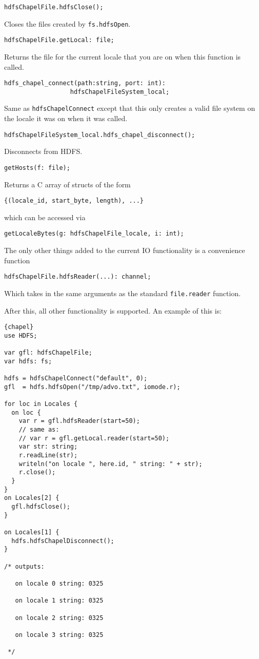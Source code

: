 \begin{lstlisting}
hdfsChapelFile.hdfsClose();
\end{lstlisting}
Closes the files created by {\tt fs.hdfsOpen}.

\begin{lstlisting}
hdfsChapelFile.getLocal: file;
\end{lstlisting}
Returns the file for the current locale that you are on when this function is called.

\begin{lstlisting}
hdfs_chapel_connect(path:string, port: int): 
                  hdfsChapelFileSystem_local;
\end{lstlisting}
Same as {\tt hdfsChapelConnect} except that this only creates a valid file system on the
locale it was on when it was called.

\begin{lstlisting}
hdfsChapelFileSystem_local.hdfs_chapel_disconnect();
\end{lstlisting}
Disconnects from HDFS.

\begin{lstlisting}
getHosts(f: file);
\end{lstlisting}
Returns a C array of structs of the form 
\begin{lstlisting}
{(locale_id, start_byte, length), ...}
\end{lstlisting}
which can be accessed via 
\begin{lstlisting}
getLocaleBytes(g: hdfsChapelFile_locale, i: int);
\end{lstlisting}
The only other things added to the current IO functionality is a convenience function
\begin{lstlisting}
hdfsChapelFile.hdfsReader(...): channel;
\end{lstlisting}
Which takes in the same arguments as the standard {\tt file.reader} function.

After this, all other functionality is supported. An example of this is:
\begin{lstlisting}{chapel}
use HDFS;

var gfl: hdfsChapelFile;
var hdfs: fs;

hdfs = hdfsChapelConnect("default", 0);
gfl  = hdfs.hdfsOpen("/tmp/advo.txt", iomode.r);

for loc in Locales {
  on loc {
    var r = gfl.hdfsReader(start=50);
    // same as:
    // var r = gfl.getLocal.reader(start=50);
    var str: string;
    r.readLine(str);
    writeln("on locale ", here.id, " string: " + str);
    r.close();
  }
}
on Locales[2] {
  gfl.hdfsClose();
}

on Locales[1] {
  hdfs.hdfsChapelDisconnect();
}

/* outputs:

   on locale 0 string: 0325

   on locale 1 string: 0325

   on locale 2 string: 0325

   on locale 3 string: 0325

 */
\end{lstlisting}

